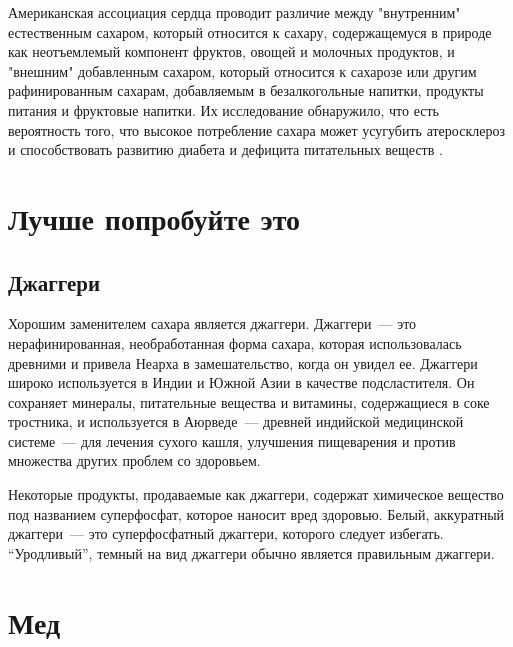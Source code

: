 Американская ассоциация сердца проводит различие между "внутренним" естественным сахаром, который относится к сахару, содержащемуся в природе как неотъемлемый компонент фруктов, овощей и молочных продуктов, и "внешним" добавленным сахаром, который относится к сахарозе или другим рафинированным сахарам, добавляемым в безалкогольные напитки, продукты питания и фруктовые напитки. Их исследование обнаружило, что есть вероятность того, что высокое потребление сахара может усугубить атеросклероз и способствовать развитию диабета и дефицита питательных веществ \cite{SugarCardiovascular}.

\section{Лучше попробуйте это}
\subsection{Джаггери}
Хорошим заменителем сахара является джаггери. Джаггери~--- это нерафинированная, необработанная форма сахара, которая использовалась древними и привела Неарха в замешательство, когда он увидел ее. Джаггери широко используется в Индии и Южной Азии в качестве подсластителя. Он сохраняет минералы, питательные вещества и витамины, содержащиеся в соке тростника, и используется в Аюрведе~--- древней индийской медицинской системе~--- для лечения сухого кашля, улучшения пищеварения и против множества других проблем со здоровьем.

\begin{KeepInMind}
Некоторые продукты, продаваемые как джаггери, содержат химическое вещество под названием суперфосфат, которое наносит вред здоровью. Белый, аккуратный джаггери~--- это суперфосфатный джаггери, которого следует избегать. “Уродливый”, темный на вид джаггери обычно является правильным джаггери.
\end{KeepInMind}

\section{Мед}

